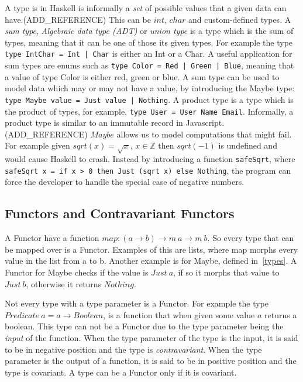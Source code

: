 A type is in Haskell is informally a \textit{set} of possible values that a
given data can have.(ADD\_REFERENCE) This can be $int$, $char$ and
custom-defined types. A \textit{sum type}, \textit{Algebraic data type (ADT)} or
\textit{union type} is a type which is the sum of types, meaning that it can be
one of those its given types. For example the type \texttt{type IntChar = Int |
Char} is either an Int or a Char. A useful application for sum types are enums
such as \texttt{type Color = Red | Green | Blue}, meaning that a value of type
Color is either red, green or blue. A sum type can be used to model data which
may or may not have a value, by introducing the Maybe type: \texttt{type Maybe
value = Just value | Nothing}. A product type is a type which is the product of
types, for example, \texttt{type User = User Name Email}.  Informally, a product
type is similar to an immutable record in Javascript. (ADD\_REFERENCE) $Maybe$
allows us to model computations that might fail. For example given $sqrt(x) =
\sqrt{x},\, x\in \mathbb{Z}$ then $sqrt(-1)$ is undefined and would cause
Haskell to crash.  Instead by introducing a function \texttt{safeSqrt}, where
\texttt{safeSqrt x = if x > 0 then Just (sqrt x) else Nothing}, the program can
force the developer to handle the special case of negative numbers. 

\subsection{Functors and Contravariant Functors}

A Functor have a function $map : (a\rightarrow b) \rightarrow m\ a \rightarrow
m\ b$. So every type that can be mapped over is a Functor.  Examples of this are
lists, where map morphs every value in the list from a to b. Another example is
for Maybe, defined in~\ref{types}. A Functor for Maybe checks if the value is
$Just\ a$, if so it morphs that value to $Just\ b$, otherwise it returns
$Nothing$. 

Not every type with a type parameter is a Functor. For example the type
$Predicate\ a = a \rightarrow Boolean$, is a function that when given some value
$a$ returns a boolean. This type can not be a Functor due to the type parameter
being the \textit{input} of the function. When the type parameter of the type is
the input, it is said to be in negative position and the type is
\textit{contravariant}.  When the type parameter is the output of a function, it
is said to be in positive position and the type is covariant. A type can be a
Functor only if it is covariant.

